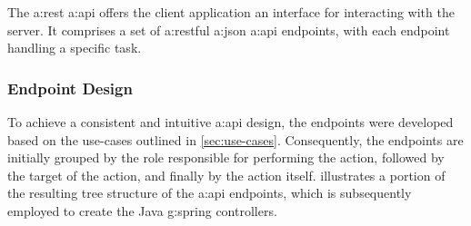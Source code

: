 The \gls{a:rest} \gls{a:api} offers the client application an interface for interacting with the server. It comprises a set of \gls{a:rest}ful \gls{a:json} \gls{a:api} endpoints, with each endpoint handling a specific task.

\subsubsection{Endpoint Design}\label{sec:cs-api-endpoints}

To achieve a consistent and intuitive \gls{a:api} design, the endpoints were developed based on the use-cases outlined in \cref{sec:use-cases}. Consequently, the endpoints are initially grouped by the role responsible for performing the action, followed by the target of the action, and finally by the action itself.  illustrates a portion of the resulting tree structure of the \gls{a:api} endpoints, which is subsequently employed to create the Java \gls{g:spring} controllers.

